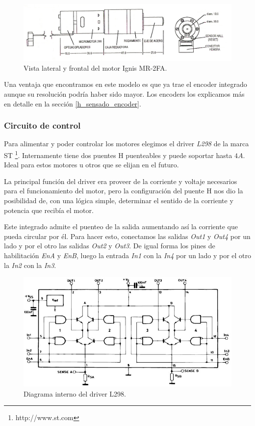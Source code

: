 \begin{figure}[ht]
	\centering
	\includegraphics[scale=1]{MR2-FA.png}
	\caption{Vista lateral y frontal del motor Ignis MR-2FA.}
	\label{hF_motorDC}
\end{figure}

Una ventaja que encontramos en este modelo es que ya trae el encoder integrado aunque su resoluci\'on podr\'ia haber sido mayor.
Los encoders los explicamos m\'as en detalle en la secci\'on \ref{h_sensado_encoder}.

\subsubsection{Circuito de control}
\label{h_actuadores_motorDC_circuito}

Para alimentar y poder controlar los motores elegimos el driver \emph{L298} de la marca ST \footnote{http://www.st.com}.
Internamente tiene dos puentes H puenteables y puede soportar hasta $4 A$. Ideal para estos motores u otros que se elijan en el futuro.

La principal funci\'on del driver era proveer de la corriente y voltaje necesarios para el funcionamiento del motor, pero la configuraci\'on
del puente H nos dio la posibilidad de, con una l\'ogica simple, determinar el sentido de la corriente y potencia que recib\'ia el motor.

Este integrado admite el puenteo de la salida aumentando as\'i la corriente que pueda circular por \'el.
Para hacer esto, conectamos las salidas \emph{Out1} y \emph{Out4} por un lado y por el otro las salidas \emph{Out2} y \emph{Out3}.
De igual forma los pines de habilitaci\'on \emph{EnA} y \emph{EnB}, luego la entrada \emph{In1} con la \emph{In4} por un lado y
por el otro la \emph{In2} con la \emph{In3}.

\begin{figure}[ht]
	\centering
	\includegraphics[scale=0.40]{L298.png}
	\caption{Diagrama interno del driver L298.}
	\label{hF_l298}
\end{figure}

